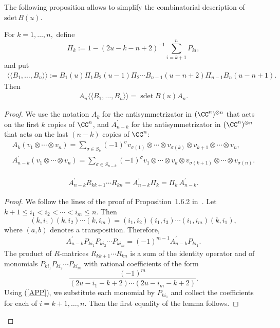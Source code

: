 The following proposition allows to simplify the combinatorial description of $\text{sdet}\, B(u)$.
\begin{proposition} \label{new}
For $k=1,\dots, n,$ define
\[
\Pi_k:=1-{(2u-k-n+2)^{-1}}\sum_{i=k+1}^{n}P_{ki},
\]
and put
\begin{gather*}
\langle \langle B_1,\dots, B_n
\rangle \rangle :=
B_1(u) \Pi_1B_2(u-1)\Pi_2\cdots B_{n-1}(u-n+2)\Pi_{n-1}B_n(u-n+1).
\end{gather*}
Then
\begin{gather*}
A_n\langle \langle B_1,\dots, B_n
\rangle \rangle =\operatorname{sdet}B(u)A_n.
\end{gather*}
\end{proposition}
\begin{proof}
We use the notation  $A_k$  for the antisymmetrizator in  $(\CC^n)^{\otimes n}$ that acts on the f\/irst $k$ copies of $\CC^n$, and
$A^{\prime}_{n-k}$  for  the antisymmetrizator  in   $(\CC^n)^{\otimes n}$ that acts on  the last $(n-k)$ copies of $\CC^n$:
\begin{gather*}
A_k (v_1\otimes \cdots\otimes v_n)=\sum_{\sigma\in S_k} (-1)^{\sigma}
v_{\sigma(1)}\otimes \cdots \otimes  v_{\sigma(k) }\otimes v_{k+1}\otimes\cdots
\otimes v_{n},
\\
A^\prime_{n-k} (v_1\otimes \cdots\otimes v_n)=\sum_{\sigma\in S_{n-k}} (-1)^{\sigma}
v_{1}\otimes \cdots \otimes v_{k }\otimes v_{\sigma(k+1)}\otimes\cdots
\otimes v_{\sigma(n)}.
\end{gather*}


\begin{lemma} \label{lem_ARR}
\begin{gather}\label{ARR}
A^\prime_{n-k} R_{kk+1}\cdots R_{kn} =
A^\prime_{n-k} \Pi_k=
\Pi_k\,A^\prime_{n-k}.
\end{gather}
\end{lemma}
\begin{proof} We follow the lines of the proof of Proposition~1.6.2 in~\cite{Mol1}. Let  $k+1\le i_1< i_2< \cdots < i_m\le n$. Then
\[
(k,i_1)(k,i_2)\cdots (k,i_m)=(i_1,i_2)(i_1,i_3)\cdots (i_{1},i_m)(k,i_1),
\]
where $(a,b)$   denotes  a  transposition.
Therefore,
\begin{gather}\label{APP}
A^\prime_{n-k}P_{ki_1}P_{ki_2}\cdots P_{ki_m}=(-1)^{m-1}A^\prime_{n-k}P_{ki_1}.
\end{gather}
The product of $R$-matrices $R_{kk+1}\cdots R_{kn}$  is a sum of  the identity operator and of monomials $P_{ki_1}P_{ki_2}\cdots P_{ki_m}$ with rational coef\/f\/icients of the form
\[
\frac{(-1)^m}{(2u-i_1-k+2)\cdots (2u-i_m-k+2)}.
\]
Using (\ref{APP}), we substitute each monomial by  $P_{ki_1}$   and   collect the coef\/f\/icients  for each  of $i=k+1,\dots, n$. Then the  f\/irst equality of the lemma follows.



\end{proof}
\end{proof}
